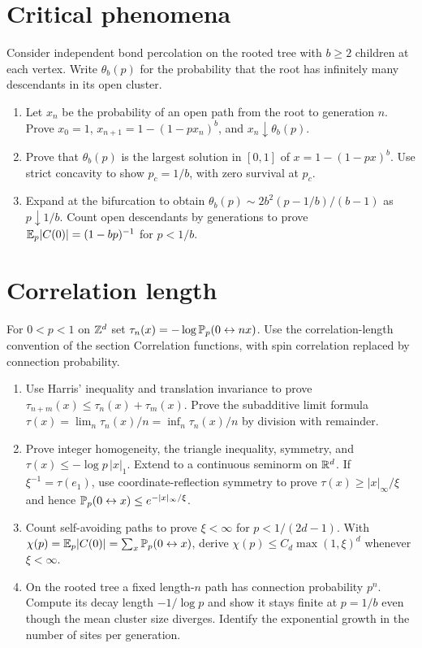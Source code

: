 \section{Critical phenomena}

\begin{exercise}
Consider independent bond percolation on the rooted tree
with $b\ge2$ children at each vertex. Write $\theta_b(p)$
for the probability that the root has infinitely many
descendants in its open cluster.
\begin{enumerate}[label=(\alph*)]
\item Let $x_n$ be the probability of an open path from
the root to generation $n$. Prove $x_0=1$,
$x_{n+1}=1-(1-px_n)^b$, and $x_n\downarrow\theta_b(p)$.
\item Prove that $\theta_b(p)$ is the largest solution in
$[0,1]$ of $x=1-(1-px)^b$. Use strict concavity to show
$p_c=1/b$, with zero survival at $p_c$.
\item Expand at the bifurcation to obtain
$\theta_b(p)\sim 2b^2(p-1/b)/(b-1)$ as $p\downarrow1/b$.
Count open descendants by generations to prove
$\mathbb E_p|C(0)|=(1-bp)^{-1}$ for $p<1/b$.
\end{enumerate}
\end{exercise}

\section{Correlation length}

\begin{exercise}
For $0<p<1$ on $\mathbb Z^d$ set
$\tau_n(x)=-\log\mathbb P_p(0\leftrightarrow nx)$.
Use the correlation-length convention of the section
Correlation functions, with spin correlation replaced by
connection probability.
\begin{enumerate}[label=(\alph*)]
\item Use Harris' inequality and translation invariance
to prove $\tau_{n+m}(x)\le\tau_n(x)+\tau_m(x)$.
Prove the subadditive limit formula
$\tau(x)=\lim_n\tau_n(x)/n=\inf_n\tau_n(x)/n$ by division
with remainder.
\item Prove integer homogeneity, the triangle inequality,
symmetry, and $\tau(x)\le-\log p\,|x|_1$. Extend to a
continuous seminorm on $\mathbb R^d$.
If $\xi^{-1}=\tau(e_1)$, use coordinate-reflection symmetry
to prove $\tau(x)\ge|x|_\infty/\xi$ and hence
$\mathbb P_p(0\leftrightarrow x)\le e^{-|x|_\infty/\xi}$.
\item Count self-avoiding paths to prove $\xi<\infty$
for $p<1/(2d-1)$. With
$\chi(p)=\mathbb E_p|C(0)|=\sum_x\mathbb P_p(0\leftrightarrow x)$,
derive $\chi(p)\le C_d\max(1,\xi)^d$ whenever $\xi<\infty$.
\item On the rooted tree a fixed length-$n$ path has
connection probability $p^n$. Compute its decay length
$-1/\log p$ and show it stays finite at $p=1/b$ even though
the mean cluster size diverges. Identify the exponential
growth in the number of sites per generation.
\end{enumerate}
\end{exercise}

